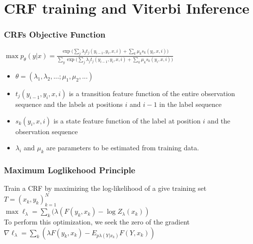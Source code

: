 \documentclass{beamer}
\begin{document}
\section{CRF training and Viterbi Inference}
\begin{frame}
  \frametitle{CRFs Objective Function}
  $\max p_\theta (y|x) = \frac{\exp(\sum_j{\lambda_jt_j(y_{i-1},y_i,x,i) + \sum_k{\mu_k s_k(y_i,x,i))}}}
                        {\sum_y {\exp(\sum_j{\lambda_jt_j(y_{i-1},y_i,x,i) + \sum_k{\mu_k s_k(y_i,x,i))}}}}$\\
  \begin{itemize}
  \item $\theta=(\lambda_1,\lambda_2,...;\mu_1,\mu_2,...)$
  \item $t_j(y_{i-1},y_i,x,i)$ is a transition feature function of the entire observation sequence and the labels at positions $i$ and 
       $i-1$ in the label sequence
  \item $s_k(y_i,x,i)$ is a state feature function of the label at position $i$ and the observation sequence
  \item $\lambda_i$ and $\mu_k$ are parameters to be estimated from training data.
  \end{itemize}
\end{frame}

\begin{frame}
  \frametitle{Maximum Log\-likehood Principle}
  Train a CRF by maximizing the log-likelihood of a give training set $T={(x_k,y_k)}_{k=1}^N$\\
  $\max \ell_{\lambda}=\sum_k{(\lambda (F(y_k,x_k)-\log Z_\lambda(x_k))}$\\
  To perform this optimization, we seek the zero of the gradient\\
  $\nabla \ell_{\lambda}=\sum_k{(\lambda F(y_k,x_k)-E_{p\lambda(Y|x_k)}F(Y,x_k))}$\\
\end{frame}
\end{document}
